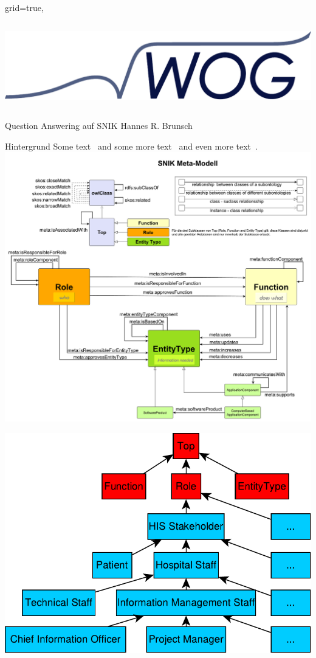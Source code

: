 \documentclass[portrait,final,a0paper,fontscale=0.320]{imiseposter}
\begin{document}
\begin{poster}%
  {grid=true,}
  {\includegraphics[height=4.5cm, width=15cm, keepaspectratio]{img/logos/wog-logo-ohne-text.pdf}} 
  {Question Answering auf SNIK}
  {Hannes R. Brunsch}
  {%
  }

\begin{posterbox}[name=background,column=0,row=0]{Hintergrund}
Some text~\cite{bb} and some more text~\cite{ob} and even more text~\cite{he}.
\includegraphics[width=\linewidth]{../Dokumentation/Images/snik-metamodel.pdf}

\includegraphics[width=0.5\linewidth]{../Dokumentation/Images/hierarchy.pdf}


\end{posterbox}
\end{poster}
\end{document}
